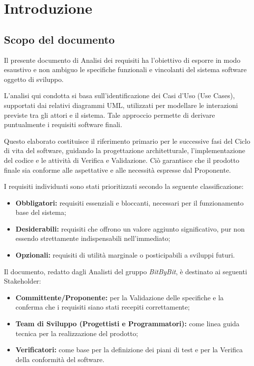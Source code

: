 \documentclass[a4paper,12pt]{article}
\begin{document}
\clearpage

\listoftables

\listoffigures

\clearpage


\section{Introduzione}
\subsection{Scopo del documento} \label{sec:scopo_documento}
Il presente documento di Analisi dei requisiti ha l'obiettivo di esporre in modo esaustivo e non ambiguo le specifiche funzionali e vincolanti del sistema software oggetto di sviluppo.

L'analisi qui condotta si basa sull'identificazione dei Casi d'Uso (Use Cases), supportati dai relativi diagrammi UML, utilizzati per modellare le interazioni previste tra gli attori e il sistema. Tale approccio permette di derivare puntualmente i requisiti software finali.

Questo elaborato costituisce il riferimento primario per le successive fasi del Ciclo di vita del software, guidando la progettazione architetturale, l'implementazione del codice e le attività di Verifica e Validazione. Ciò garantisce che il prodotto finale sia conforme alle aspettative e alle necessità espresse dal Proponente.

I requisiti individuati sono stati prioritizzati secondo la seguente classificazione:
\begin{itemize}
    \item \textbf{Obbligatori:} requisiti essenziali e bloccanti, necessari per il funzionamento base del sistema;
    \item \textbf{Desiderabili:} requisiti che offrono un valore aggiunto significativo, pur non essendo strettamente indispensabili nell'immediato;
    \item \textbf{Opzionali:} requisiti di utilità marginale o posticipabili a sviluppi futuri.
\end{itemize}

Il documento, redatto dagli Analisti del gruppo \textit{BitByBit}, è destinato ai seguenti Stakeholder:
\begin{itemize}
    \item \textbf{Committente/Proponente:} per la Validazione delle specifiche e la conferma che i requisiti siano stati recepiti correttamente;
    \item \textbf{Team di Sviluppo (Progettisti e Programmatori):} come linea guida tecnica per la realizzazione del prodotto;
    \item \textbf{Verificatori:} come base per la definizione dei piani di test e per la Verifica della conformità del software.
\end{itemize}
\end{document}
